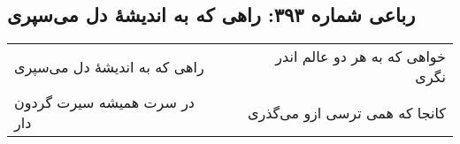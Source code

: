 \begin{center}
\section*{رباعی شماره ۳۹۳: راهی که به اندیشهٔ دل می‌سپری}
\label{sec:sh393}
\begin{longtable}{l p{0.5cm} r}
راهی که به اندیشهٔ دل می‌سپری
&&
خواهی که به هر دو عالم اندر نگری
\\
در سرت همیشه سیرت گردون دار
&&
کانجا که همی ترسی ازو می‌گذری
\\
\end{longtable}
\end{center}
